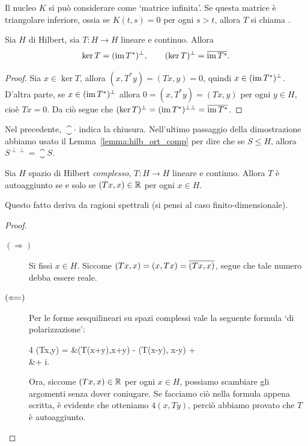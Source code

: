 \begin{remark}
	Il nucleo $K$ si può considerare come `matrice infinita'. Se questa matrice è triangolare inferiore, ossia se $K(t,s) = 0$ per ogni $s>t$, allora $T$ si chiama .
\end{remark}

\begin{lemma}
	Sia $H$ di Hilbert, sia $T : H \to H$ lineare e continuo.
	Allora
	\begin{equation*}
		\ker T = (\operatorname{im} T^*)^\perp, \qquad (\ker T)^\perp = \overline{\operatorname{im} T^*}.
	\end{equation*}
\end{lemma}
\begin{proof}
	Sia $x \in \ker T$, allora $(x, T^*y) = (Tx, y)=0$, quindi $x \in (\operatorname{im} T^*)^\perp$.
	D'altra parte, se $x \in (\operatorname{im} T^*)^\perp$ allora $0 = (x, T^*y) = (Tx,y)$ per ogni $y \in H$, cioè $Tx = 0$.
	Da ciò segue che $(\ker T)^\perp = (\operatorname{im} T^*)^{\perp\perp} = \overline{\operatorname{im} T^*}$.
\end{proof}

\begin{remark}
	Nel precedente, $\closure{\cdot}$ indica la chiusura.
	Nell'ultimo passaggio della dimostrazione abbiamo usato il Lemma~\ref{lemma:hilb_ort_comp} per dire che se $S \leq H$, allora $S^{\perp\perp} = \closure{S}$.
\end{remark}

\begin{theorem}
	Sia $H$ spazio di Hilbert \emph{complesso}, $T:H \to H$ lineare e continuo.
	Allora $T$ è autoaggiunto se e solo se $(Tx, x) \in \mathbb{R}$ per ogni $x \in H$.
\end{theorem}
\begin{remark}
	Questo fatto deriva da ragioni spettrali (si pensi al caso finito-dimensionale).
\end{remark}
\begin{proof}
	\leavevmode
	\begin{description}
		\item[$(\Longrightarrow)$] Si fissi $x \in H$. Siccome $(Tx,x) = (x,Tx) = \overline{(Tx,x)}$, segue che tale numero debba essere reale.
		\item[$(\Longleftarrow)$] Per le forme sesquilineari su spazi complessi vale la seguente formula `di polarizzazione':
		\begin{eqalign*}
			4 (Tx,y) = &(T(x+y),x+y) - (T(x-y), x-y) +\\
				&\qquad + i\left[ (T(x+iy),x+iy) - (T(x-iy), x-iy) \right].
		\end{eqalign*}
		Ora, siccome $(Tx,x) \in \mathbb{R}$ per ogni $x \in H$, possiamo scambiare gli argomenti senza dover coniugare. Se facciamo ciò nella formula appena scritta, è evidente che otteniamo $4(x,Ty)$, perciò abbiamo provato che $T$ è autoaggiunto.
	\end{description}
\end{proof}

